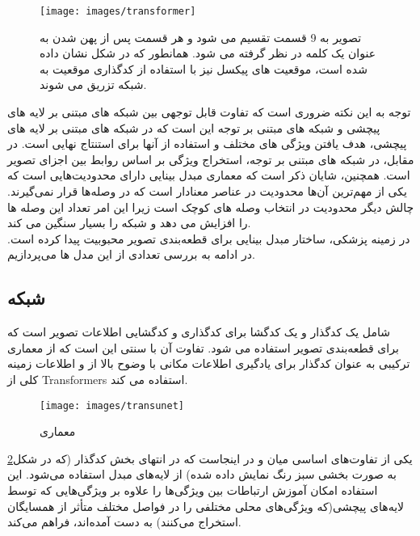 \begin{figure}[h]
\centerline{\texttt{[image: images/transformer]}}
\caption[\hspace{0.5em}معماری ]{    تصویر به 9 قسمت تقسیم می شود و هر قسمت پس از پهن شدن به عنوان یک کلمه در نظر گرفته می شود. همانطور که در شکل نشان داده شده است، موقعیت های پیکسل نیز با استفاده از کدگذاری موقعیت به شبکه تزریق می شوند\cite{thisanke2023semantic}.
}
\label{fig:transformer}
\end{figure}
توجه به این نکته ضروری است که تفاوت قابل توجهی بین شبکه های مبتنی بر لایه های پیچشی و شبکه های مبتنی بر توجه این است که در شبکه های مبتنی بر لایه های پیچشی، هدف یافتن ویژگی های مختلف و استفاده از آنها برای استنتاج نهایی است. در مقابل، در شبکه های مبتنی بر توجه، استخراج ویژگی بر اساس روابط بین اجزای تصویر است. همچنین، شایان ذکر است که معماری مبدل بینایی دارای محدودیت‌هایی است که یکی از مهم‌ترین آن‌ها محدودیت در عناصر معنادار است که در وصله‌ها قرار نمی‌گیرند. چالش دیگر محدودیت در انتخاب وصله های کوچک است زیرا این امر تعداد این وصله ها را افزایش می دهد و شبکه را بسیار سنگین می کند\cite{thisanke2023semantic}.
\\
در زمینه پزشکی، ساختار مبدل بینایی برای قطعه‌بندی تصویر محبوبیت پیدا کرده است. در ادامه به بررسی تعدادی از این مدل ها می‌پردازیم.
\\
\subsection{ شبکه }
 شامل یک کدگذار و یک کدگشا برای کدگذاری و کدگشایی اطلاعات تصویر است که برای قطعه‌بندی تصویر استفاده می شود. تفاوت آن با  سنتی این است که  از معماری ترکیبی  به عنوان کدگذار برای یادگیری اطلاعات مکانی با وضوح بالا از  و اطلاعات زمینه کلی از Transformers استفاده می کند.
\\

\begin{figure}[h]
\centerline{\texttt{[image: images/transunet]}}
\caption[\hspace{0.5em}معماری ]{معماری \cite{chen2021transunet}}
\label{fig:transunet}
\end{figure}
یکی از تفاوت‌های اساسی میان  و  در اینجاست که در انتهای بخش کدگذار (که در شکل\ref{fig:transunet} به صورت بخشی سبز رنگ نمایش داده شده) از لایه‌های مبدل استفاده می‌شود. این استفاده امکان آموزش ارتباطات بین ویژگی‌ها را علاوه بر ویژگی‌هایی که توسط لایه‌های پیچشی(که ویژگی‌های محلی مختلفی را در فواصل مختلف متأثر از همسایگان استخراج می‌کنند) به دست آمده‌اند، فراهم می‌کند\cite{chen2021transunet}.

